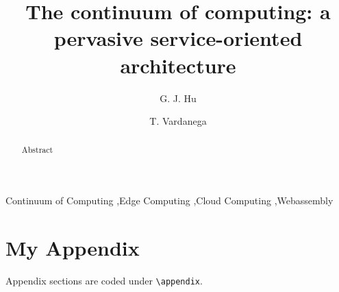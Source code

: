 \documentclass{elsarticle}
\begin{document}
\begin{frontmatter}


\title{The continuum of computing: a pervasive service-oriented architecture}

\author[1]{G. J. Hu}
\author[1]{T. Vardanega}
\address[1]{Department of Mathematics, University of Padova, Italy}

\begin{abstract}
Abstract
\end{abstract}



\begin{keyword}
Continuum of Computing \sep Edge Computing \sep Cloud Computing \sep Webassembly
\end{keyword}

\end{frontmatter}



\appendix
\section{My Appendix}
Appendix sections are coded under \verb+\appendix+.




%



\end{document}
